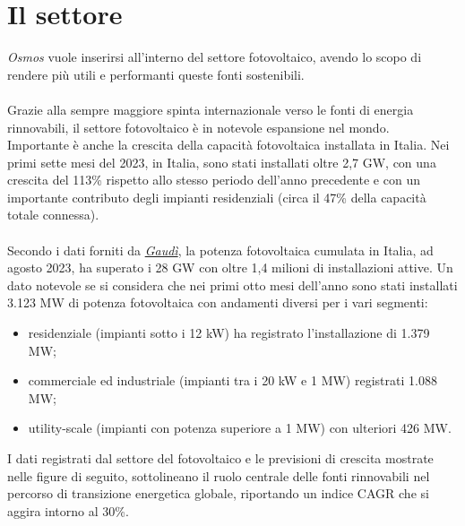\documentclass[a4paper, 12pt]{article}
\begin{document}
	\section{Il settore}
	\emph{Osmos} vuole inserirsi all'interno del settore fotovoltaico, avendo lo scopo di rendere più utili e performanti queste fonti sostenibili.\\\\
	Grazie alla sempre maggiore spinta internazionale verso le fonti di energia rinnovabili, il settore fotovoltaico è in notevole espansione nel mondo.\\
	Importante è anche la crescita della capacità fotovoltaica installata in Italia. Nei primi sette mesi del 2023, in Italia, sono stati installati oltre 2,7 GW, con una crescita del 113\% rispetto allo stesso periodo dell'anno precedente e con un importante contributo degli impianti residenziali (circa il 47\% della capacità totale connessa).\\\\
	Secondo i dati forniti da \href{https://www.terna.it/it/sistema-elettrico/dispacciamento/fonti-rinnovabili}{\emph{Gaudì}}, la potenza fotovoltaica cumulata in Italia, ad agosto 2023, ha superato i 28 GW con oltre 1,4 milioni di installazioni attive. Un dato notevole se si considera che nei primi otto mesi dell'anno sono stati installati 3.123 MW di potenza fotovoltaica con andamenti diversi per i vari segmenti:
	\begin{itemize}
		\item residenziale (impianti sotto i 12 kW) ha registrato l'installazione di 1.379 MW;
		\item commerciale ed industriale (impianti tra i 20 kW e 1 MW) registrati 1.088 MW;
		\item utility-scale (impianti con potenza superiore a 1 MW) con ulteriori 426 MW.
	\end{itemize}
	I dati registrati dal settore del fotovoltaico e le previsioni di crescita mostrate nelle figure di seguito, sottolineano il ruolo centrale delle fonti rinnovabili nel percorso di transizione energetica globale, riportando un indice CAGR che si aggira intorno al 30\%.
\end{document}
